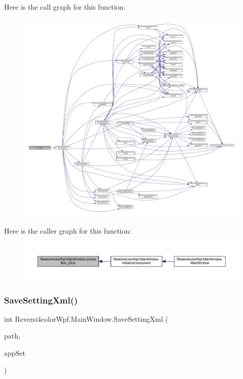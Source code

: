 Here is the call graph for this function\+:
\nopagebreak
\begin{figure}[H]
\begin{center}
\leavevmode
\includegraphics[width=350pt]{class_reversi4color_wpf_1_1_main_window_abdd178ee605694145f7d214870176c07_cgraph}
\end{center}
\end{figure}
Here is the caller graph for this function\+:
\nopagebreak
\begin{figure}[H]
\begin{center}
\leavevmode
\includegraphics[width=350pt]{class_reversi4color_wpf_1_1_main_window_abdd178ee605694145f7d214870176c07_icgraph}
\end{center}
\end{figure}
\mbox{\label{class_reversi4color_wpf_1_1_main_window_a4e19f2a69efe18846507ba092d119073}} 
\subsubsection{\texorpdfstring{Save\+Setting\+Xml()}{SaveSettingXml()}}
{\footnotesize\ttfamily int Reversi4color\+Wpf.\+Main\+Window.\+Save\+Setting\+Xml (\begin{DoxyParamCaption}\item[{string}]{path,  }\item[{ref \hyperlink{class_reversi4color_wpf_1_1_reversi_setting}{Reversi\+Setting}}]{app\+Set }\end{DoxyParamCaption})}



